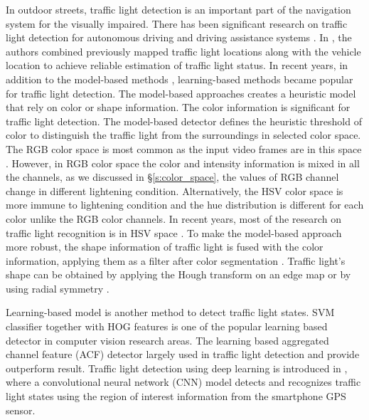 In outdoor streets, traffic light detection is an important part of the navigation system for the visually impaired.
There has been significant research on traffic light detection for autonomous driving and driving assistance systems \cite{traffic_turan,selfdrive,traffic,traffic2,traffic3}.
In \cite{traffic_turan}, the authors combined previously mapped traffic light locations along with the vehicle location to achieve reliable estimation of traffic light status.
In recent years, in addition to the model-based methods \cite{model,model2}, learning-based methods \cite{survey_traffic} became popular for traffic light detection.
The model-based approaches creates a heuristic model that rely on color or shape information.
The color information is significant for traffic light detection.
The model-based detector defines the heuristic threshold of color to distinguish the traffic light from the surroundings in selected color space.
The RGB color space is most common as the input video frames are in this space \cite{rgb2}.
However, in RGB color space the color and intensity information is mixed in all the channels, as we discussed in \S\ref{s:color_space}, the values of RGB channel change in different lightening condition.
Alternatively, the HSV color space is more immune to lightening condition and the hue distribution is different for each color unlike the RGB color channels.
In recent years, most of the research on traffic light recognition is in HSV space \cite{hsv2}.
To make the model-based approach  more robust, the shape information of traffic light is fused with the color information, applying them as a filter after color segmentation \cite{signalguru}.
Traffic light's shape can be obtained by applying the Hough transform on an edge map \cite{hough,hough2,signalguru} or by using radial symmetry \cite{radial,radial2}.

Learning-based model \cite{learning,learning2} is another method to detect traffic light states.
SVM classifier together with HOG features \cite{selfdrive} is one of the popular learning based detector in computer vision research areas.
The learning based aggregated channel feature (ACF) \cite{acf,acf2,lisa_cvpr} detector largely used in traffic light detection and provide outperform result.
Traffic light detection using deep learning is introduced in \cite{cnn,cnn2,cnn3}, where a convolutional neural network (CNN) model detects and recognizes traffic light states using the region of interest information from the smartphone GPS sensor.

